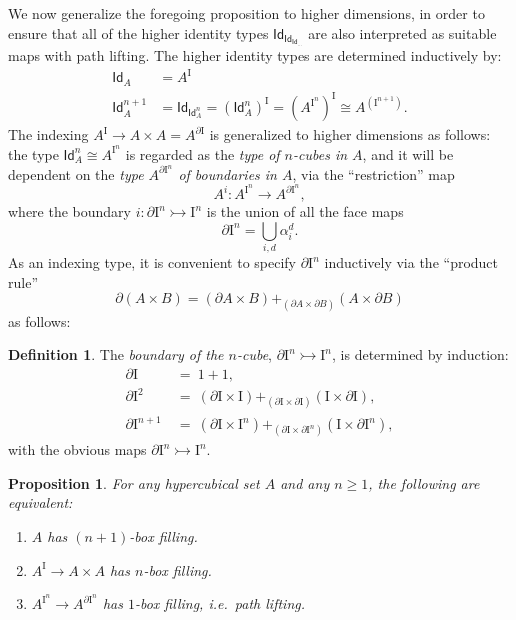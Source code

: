 \documentclass[11pt]{article}
\newcommand{\mono}{\ensuremath{\rightarrowtail}}
\newcommand{\I}{\ensuremath{\mathrm{I}}}
\newcommand{\Id}{\mathsf{Id}}
\newcommand{\id}[1]{\Id_{#1}}
\newtheorem{proposition}[theorem]{Proposition}
\theoremstyle{remark}
\theoremstyle{definition}
\newtheorem{definition}[theorem]{Definition}
\begin{document}
We now generalize the foregoing proposition to higher dimensions, in order to ensure that all of the higher identity types $\id{\id{\id{\dots}}}$ are also interpreted as suitable maps with path lifting.  The higher identity types are determined inductively by:
\begin{align*}
\id{A} &= A^\I \\
\Id^{n+1}_{A} &= \id{{\Id}^{n}_{A}} = (\Id^{n}_{A})^\I = (A^{\I^n})^\I \cong A^{(\I^{n+1})}.
\end{align*}
The indexing $A^\I \to A\times A = A^{\partial\I}$ is generalized to higher dimensions as follows: the type $\Id^{n}_{A} \cong A^{\I^n}$ is regarded as the \emph{type of $n$-cubes in $A$}, and it will be dependent on the \emph{type $A^{\partial\I^n}$ of boundaries in $A$}, via the ``restriction'' map $$A^i : A^{\I^n} \to A^{\partial\I^n},$$  where the boundary $i : \partial\I^n \mono \I^n$ is the union of all the face maps $$\partial\I^n = \bigcup_{i, d} \alpha_i^d.$$
As an indexing type, it is convenient to specify $\partial\I^n$ inductively via the ``product rule'' $$\partial(A\times B) = (\partial A\times B) +_{(\partial A\times\partial B)} (A\times\partial B)$$
as follows:
\begin{definition}\label{def:boundary}
The \emph{boundary of the $n$-cube}, $\partial\I^n \mono \I^n$, is determined by induction: 
\begin{align*}
\partial\I &\ =\  1+1,\\
\partial\I^2 &\ =\ (\partial\I\times\I) +_{(\partial\I\times\partial\I)} (\I\times\partial\I),\\
\partial\I^{n+1} &\ =\ (\partial\I\times\I^n) +_{(\partial\I\times\partial\I^n)} (\I\times\partial\I^n),
\end{align*}
with the obvious maps $\partial\I^n \mono \I^n$.
\end{definition}

\begin{proposition}\label{prop:main}
For any hypercubical set $A$ and any $n\geq 1$, the following are equivalent:
\begin{enumerate}
\item $A$ has $(n+1)$-box filling.
\item $A^\I \to A\times A$ has $n$-box filling.
\item $A^{\I^n} \to A^{\partial\I^n}$ has $1$-box filling, i.e.\ path lifting.
\end{enumerate}
\end{proposition}
\end{document}
